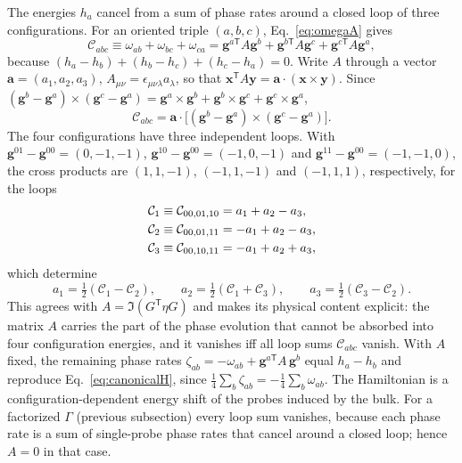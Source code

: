 \documentclass[11pt,a4paper]{article}
\begin{document}
The energies $h_a$ cancel from a sum of phase rates around a closed loop
of three configurations. For an oriented triple $(a,b,c)$,
Eq.~\eqref{eq:omegaA} gives
\begin{equation}
 \mathcal C_{abc}\equiv\omega_{ab}+\omega_{bc}+\omega_{ca}
 =\mathbf g^{a\mathsf T}A\mathbf g^b+\mathbf g^{b\mathsf T}A\mathbf g^c
 +\mathbf g^{c\mathsf T}A\mathbf g^a,
\end{equation}
because $(h_a-h_b)+(h_b-h_c)+(h_c-h_a)=0$.
Write $A$ through a vector $\mathbf a=(a_1,a_2,a_3)$,
$A_{\mu\nu}=\epsilon_{\mu\nu\lambda}a_\lambda$, so that
$\mathbf x^{\mathsf T}A\mathbf y=\mathbf a\cdot(\mathbf x\times\mathbf y)$.
Since $(\mathbf g^b-\mathbf g^a)\times(\mathbf g^c-\mathbf g^a)
=\mathbf g^a\times\mathbf g^b+\mathbf g^b\times\mathbf g^c+\mathbf g^c\times\mathbf g^a$,
\begin{equation}
 \mathcal C_{abc}
 =\mathbf a\cdot\bigl[(\mathbf g^b-\mathbf g^a)\times
 (\mathbf g^c-\mathbf g^a)\bigr].
 \label{eq:loopsum}
\end{equation}
The four configurations have three independent loops. With
$\mathbf g^{01}-\mathbf g^{00}=(0,-1,-1)$, $\mathbf g^{10}-\mathbf g^{00}=(-1,0,-1)$
and $\mathbf g^{11}-\mathbf g^{00}=(-1,-1,0)$, the cross products are
$(1,1,-1)$, $(-1,1,-1)$ and $(-1,1,1)$, respectively, for the loops
\begin{align}
 \mathcal C_1&\equiv \mathcal C_{00,01,10}=a_1+a_2-a_3,\notag\\
 \mathcal C_2&\equiv \mathcal C_{00,01,11}=-a_1+a_2-a_3,\\
 \mathcal C_3&\equiv \mathcal C_{00,10,11}=-a_1+a_2+a_3,\notag
\end{align}
which determine
\begin{equation}
 a_1=\tfrac12(\mathcal C_1-\mathcal C_2),\qquad
 a_2=\tfrac12(\mathcal C_1+\mathcal C_3),\qquad
 a_3=\tfrac12(\mathcal C_3-\mathcal C_2).
 \label{eq:Asolution}
\end{equation}
This agrees with $A=\Im(G^{\mathsf T}\eta G)$ and makes its physical
content explicit: the matrix $A$ carries the part of the phase evolution
that cannot be absorbed into four configuration energies, and it
vanishes iff all loop sums $\mathcal C_{abc}$ vanish. With $A$ fixed,
the remaining phase rates $\zeta_{ab}=-\omega_{ab}+\mathbf g^{a\mathsf T}A\,\mathbf g^b$
equal $h_a-h_b$ and reproduce Eq.~\eqref{eq:canonicalH}, since
$\frac14\sum_b\zeta_{ab}=-\frac14\sum_b\omega_{ab}$. The Hamiltonian is a
configuration-dependent energy shift of the probes induced by the bulk.
For a factorized $\Gamma$ (previous subsection) every loop sum vanishes,
because each phase rate is a sum of single-probe phase rates that cancel
around a closed loop; hence $A=0$ in that case.
\end{document}
